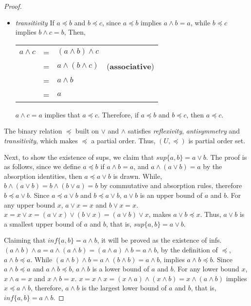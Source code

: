 \begin{proof}
\begin{itemize}
\item \textit{transitivity}
If $a \preceq b$ and $b \preceq c$, since $a \preceq b$ implies $a \wedge b = a$, while $b \preceq c$ implies $b \wedge c = b$, Then, 

\begin{tabular}{l l l l}
$a \wedge c$ & = & $(a \wedge b) \wedge c$ & \\
             & = & $a \wedge (b \wedge c)$ & (\textbf{associative}) \\
             & = & $a \wedge b$ & \\
             & = & $a$ &
\end{tabular}

$a \wedge c = a$ implies that $a \preceq c$. Therefore, if $a \preceq b$ and $b \preceq c$, then 
$a \preceq c$.
\end{itemize}

The binary relation $\preceq$ built on $\vee$ and $\wedge$ satisfies \textit{reflexivity}, \textit{antisymmetry} and \textit{transitivity}, which makes $\preceq$ a partial order. Thus, $(U,\preceq)$ is partial order set. 

Next, to show the existence of sups, we claim that $sup\{a,b\}=a \vee b$. The proof is as follows,
since we define $a \preceq b$ if $a \wedge b = a$, and $a \wedge (a \vee b) = a$ by the absorption identities, then $a \preceq a \vee b$ is drawn. While, $b \wedge (a \vee b) = b \wedge (b \vee a) = b$ by commutative and absorption rules, therefore $b \preceq a \vee b$. Since $a \preceq a\vee b$ and $b \preceq a \vee b$, $a \vee b$ is an upper bound of $a$ and $b$. For any upper bound $x$, 
$a \vee x = x$ and $b \vee x = x$. $x = x \vee x = (a \vee x) \vee (b \vee x) = (a \vee b) \vee x$, makes $a \vee b \preceq x$. Thus, $a \vee b$ is a smallest upper bound of $a$ and $b$, that is, 
$sup\{a,b\} = a \vee b$.

Claiming that $inf\{a,b\}=a \wedge b$, it will be proved as the existence of infs. $(a \wedge b) \wedge a = a \wedge (a \wedge b) = (a \wedge a) \wedge b = a \wedge b$, by the definition of 
$\preceq$, $a \wedge b \preceq a$. 
While $(a \wedge b) \wedge b = a \wedge (b \wedge b) = a \wedge b$, implies $a \wedge b \preceq b$.
Since $a \wedge b \preceq a$ and $a \wedge b \preceq b$, $a \wedge b$ is a lower bound of $a$ and 
$b$. For any lower bound $x$, $x \wedge a = x$ and $x \wedge b = x$. 
$x = x \wedge x = (x \wedge a) \wedge (x \wedge b) = x \wedge (a \wedge b)$ implies 
$x \preceq a \wedge b$, therefore, $a \wedge b$ is the largest lower bound of $a$ and $b$, that is,
$inf\{a,b\} = a \wedge b$.

\end{proof}

